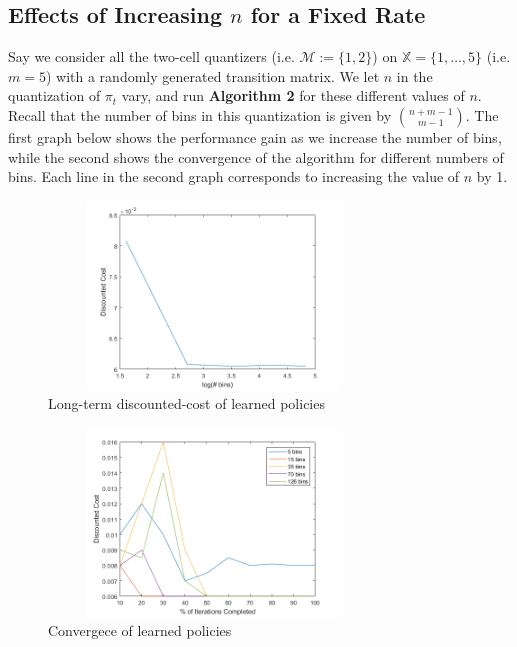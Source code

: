 \documentclass[conference, draftcls, onecolumn]{IEEEtran}
\begin{document}
\subsection{Effects of Increasing \(n\) for a Fixed Rate}
Say we consider all the two-cell quantizers (i.e. \(\mathcal{M} := \{1,2\}\)) on \( \mathbb{X} = \{1,\ldots,5\} \) (i.e. \(m = 5\)) with a randomly generated transition matrix. We let \(n\) in the quantization of \( \pi_t \) vary, and run \textbf{Algorithm 2} for these different values of \(n\). Recall that the number of bins in this quantization is given by \({{n+m-1} \choose {m-1}}\). The first graph below shows the performance gain as we increase the number of bins, while the second shows the convergence of the algorithm for different numbers of bins. Each line in the second graph corresponds to increasing the value of \(n\) by 1.
\vspace{-1em}
\begin{figure}[H]
    \centering
    \includegraphics[height=5cm, width=8.75cm]{cost_5.png}
    \caption{Long-term discounted-cost of learned policies}
\end{figure}
\vspace{-1em}
\begin{figure}[H]
    \centering
    \includegraphics[height=5cm, width=8.75cm]{convergence_5.png}
    \caption{Convergece of learned policies}
\end{figure}
\end{document}
